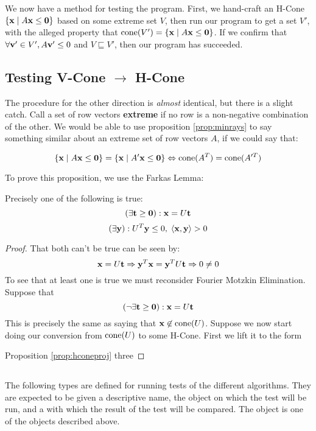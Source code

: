 We now have a method for testing the program.  First, we hand-craft an H-Cone $\left\{\mathbf{x}\;|\; A\mathbf{x}\leq\mathbf{0}\right\}$ based on some extreme set $V$, then run our program to get a set $V'$, with the alleged property that $\operatorname{cone}(V') = \left\{\mathbf{x}\;|\; A\mathbf{x}\leq\mathbf{0}\right\}$.  If we confirm that $\forall \mathbf{v}'\in V', A\mathbf{v}'\leq 0$ and $V \sqsubseteq V'$, then our program has succeeded.

\subsection{Testing V-Cone $\to$ H-Cone}
The procedure for the other direction is \textit{almost} identical, but there is a slight catch.  Call a set of row vectors \textbf{extreme} if no row is a non-negative combination of the other.  We would be able to use proposition \ref{prop:minrays} to say something similar about an extreme set of row vectors $A$, if we could say that:

\begin{Prop} 
  \[ \left\{\mathbf{x}\;|\; A\mathbf{x}\leq\mathbf{0}\right\} = \left\{\mathbf{x}\;|\; A'\mathbf{x}\leq\mathbf{0}\right\} \Leftrightarrow \operatorname{cone}(A^T) = \operatorname{cone}(A'^T) \]
\end{Prop}

To prove this proposition, we use the Farkas Lemma:

\begin{Prop}
  Precisely one of the following is true:
  \[ (\exists \mathbf{t} \geq \mathbf{0}) : \mathbf{x} = U\mathbf{t} \]
  \[ (\exists \mathbf{y}) : U^T\mathbf{y} \leq 0,\; \left\langle \mathbf{x}, \mathbf{y} \right\rangle > 0 \]
\end{Prop}



\begin{proof}  That both can't be true can be seen by:
  \[ \mathbf{x} = U\mathbf{t} \Rightarrow \mathbf{y}^T\mathbf{x} = \mathbf{y}^T U\mathbf{t} \Rightarrow 0 \neq 0 \]
To see that at least one is true we must reconsider Fourier Motzkin Elimination.  Suppose that
  \[ (\neg \exists \mathbf{t} \geq \mathbf{0}) : \mathbf{x} = U\mathbf{t} \]
This is precisely the same as saying that $\mathbf{x} \not\in \operatorname{cone}(U)$.  Suppose we now start doing our conversion from $\operatorname{cone}(U)$ to some H-Cone.  First we lift it to the form

  Proposition \ref{prop:hconeproj} three 
\end{proof}

\subsection{}

The following types are defined for running tests of the different algorithms.  They are expected to be given a descriptive name, the object on which the test will be run, and a  with which the result of the test will be compared.  The  object is one of the objects described above.
\lsthconetestcasea
\lstvconetestcasea
\lsthpolytestcaseb
\lstvpolytestcaseb


